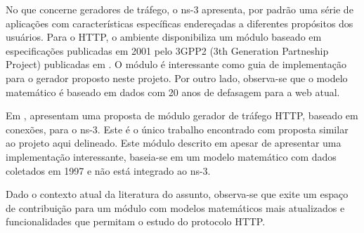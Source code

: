 No que concerne geradores de tráfego, o ns-3 apresenta, por padrão uma série de aplicações com características específicas endereçadas a diferentes propósitos dos usuários. Para o HTTP, o ambiente disponibiliza um módulo baseado em especificações publicadas em 2001 pelo 3GPP2 (3th Generation Partneship Project) publicadas em \cite{3GPP2-2001}. O módulo é interessante como guia de implementação para o gerador proposto neste projeto. Por outro lado, observa-se que o modelo matemático é baseado em dados com 20 anos de defasagem para a web atual.

Em \cite{Cheng2013},  apresentam uma proposta de módulo gerador de tráfego HTTP, baseado em conexões, para o ns-3. Este é o único trabalho encontrado com proposta similar ao projeto aqui delineado. Este módulo descrito em \cite{Cheng2013} apesar de apresentar uma implementação interessante, baseia-se em um modelo matemático com dados coletados em 1997 e não está integrado ao ns-3.

Dado o contexto atual da literatura do assunto, observa-se que exite um espaço de contribuição para um módulo com modelos matemáticos mais atualizados e funcionalidades que permitam o estudo do protocolo HTTP.
